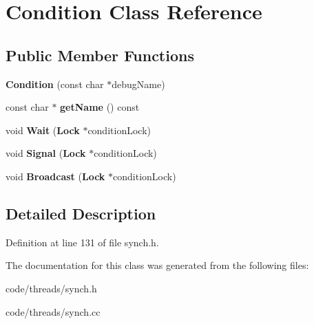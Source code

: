 \section{Condition Class Reference}
\label{class_condition}
\subsection*{Public Member Functions}
\begin{DoxyCompactItemize}
\item 
{\bfseries Condition} (const char $\ast$debug\+Name)\label{class_condition_a518a2676e2b33b0481f185d0f942c9c1}

\item 
const char $\ast$ {\bfseries get\+Name} () const \label{class_condition_aa7461709a0670aa96264fca1c89dda60}

\item 
void {\bfseries Wait} ({\bf Lock} $\ast$condition\+Lock)\label{class_condition_aa0442520888bd371ce07d07c0a4313a7}

\item 
void {\bfseries Signal} ({\bf Lock} $\ast$condition\+Lock)\label{class_condition_ada25a70d161b7dc9b81eaad0ef66d91c}

\item 
void {\bfseries Broadcast} ({\bf Lock} $\ast$condition\+Lock)\label{class_condition_aefae94b3f9be40a09df667e63a4bdab7}

\end{DoxyCompactItemize}


\subsection{Detailed Description}


Definition at line 131 of file synch.\+h.



The documentation for this class was generated from the following files\+:\begin{DoxyCompactItemize}
\item 
code/threads/synch.\+h\item 
code/threads/synch.\+cc\end{DoxyCompactItemize}
